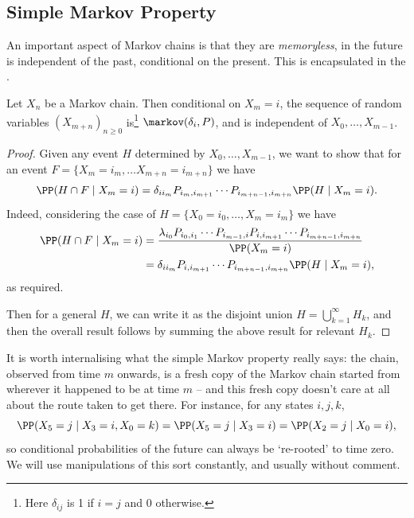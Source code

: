 \documentclass[a4paper]{scrartcl}
\begin{document}
\subsection{Simple Markov Property}

An important aspect of Markov chains is that they are \emph{memoryless}, in the future is independent of the past, conditional on the present. This is encapsulated in the .

\begin{theorem}
	Let $X_n$ be a Markov chain. Then conditional on $X_m = i$, the sequence of random variables $(X_{m + n})_{n \geq 0}$ is\footnote{Here $\delta_{ij}$ is 1 if $i = j$ and 0 otherwise.} $\markov(\delta_i, P)$, and is independent of $X_0, \dots, X_{m - 1}$.
\end{theorem}
\begin{proof}
	Given any event $H$ determined by $X_0, \dots, X_{m - 1}$, we want to show that for an event $F = \{X_m = i_m, \dots X_{m + n} = i_{m +n}\}$ we have
	$$
	\PP(H \cap F \mid X_m = i) = \delta_{ii_m}P_{i_m, i_{m + 1}} \cdots P_{i_{m + n-1}, i_{m + n}} \PP(H \mid X_m = i).
	$$
	Indeed, considering the case of $H = \{X_0 = i_0, \dots, X_m = i_m\}$ we have
	\begin{align*}
		\PP(H \cap F \mid X_m = i) &= \frac{\lambda_{i_0}P_{i_0, i_1} \cdots P_{i_{m - 1}, i}P_{i, i_{m + 1}} \cdots P_{i_{m + n - 1}, i_{m + n}}}{\PP(X_m = i)} \\
		&= \delta_{i i_m}P_{i, i_{m + 1}} \cdots P_{i_{m + n - 1}, i_{m + n}} \PP(H \mid X_m = i),
	\end{align*}
	as required. 
	
	Then for a general $H$, we can write it as the disjoint union $H = \bigcup_{k = 1}^{\infty} H_k$, and then the overall result follows by summing the above result for relevant $H_k$.
\end{proof}

\begin{remark}
	It is worth internalising what the simple Markov property really says: the chain, observed from time $m$ onwards, is a fresh copy of the Markov chain started from wherever it happened to be at time $m$ -- and this fresh copy doesn't care at all about the route taken to get there. For instance, for any states $i, j, k$,
	$$
	\PP(X_5 = j \mid X_3 = i, X_0 = k) = \PP(X_5 = j \mid X_3 = i) = \PP(X_2 = j \mid X_0 = i),
	$$
	so conditional probabilities of the future can always be `re-rooted' to time zero. We will use manipulations of this sort constantly, and usually without comment.
\end{remark}
\end{document}
